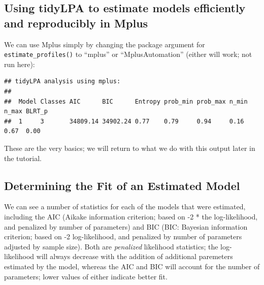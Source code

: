 \documentclass[man]{apa6}
\newenvironment{Shaded}{\begin{snugshade}}{\end{snugshade}}
\newcommand{\DataTypeTok}[1]{\textcolor[rgb]{0.13,0.29,0.53}{#1}}
\newcommand{\DecValTok}[1]{\textcolor[rgb]{0.00,0.00,0.81}{#1}}
\newcommand{\KeywordTok}[1]{\textcolor[rgb]{0.13,0.29,0.53}{\textbf{#1}}}
\newcommand{\NormalTok}[1]{#1}
\newcommand{\OperatorTok}[1]{\textcolor[rgb]{0.81,0.36,0.00}{\textbf{#1}}}
\newcommand{\StringTok}[1]{\textcolor[rgb]{0.31,0.60,0.02}{#1}}
\begin{document}
\hypertarget{using-tidylpa-to-estimate-models-efficiently-and-reproducibly-in-mplus}{%
\subsection{Using tidyLPA to estimate models efficiently and reproducibly in Mplus}\label{using-tidylpa-to-estimate-models-efficiently-and-reproducibly-in-mplus}}

We can use Mplus simply by changing the package argument for
\texttt{estimate\_profiles()} to \enquote{mplus} or \enquote{MplusAutomation} (either will work; not run
here):

\begin{Shaded}
\end{Shaded}

\begin{verbatim}
## tidyLPA analysis using mplus: 
## 
##  Model Classes AIC      BIC      Entropy prob_min prob_max n_min n_max BLRT_p
##  1     3       34809.14 34902.24 0.77    0.79     0.94     0.16  0.67  0.00
\end{verbatim}

These are the very basics; we will return to what we do with this output later
in the tutorial.

\hypertarget{determining-the-fit-of-an-estimated-model}{%
\subsection{Determining the Fit of an Estimated Model}\label{determining-the-fit-of-an-estimated-model}}

We can see a number of statistics for each of the models that were estimated,
including the AIC (Aikake information criterion; based on -2 * the
log-likelihood, and penalized by number of parameters) and BIC (BIC: Bayesian
information criterion; based on -2 log-likelihood, and penalized by number of
parameters adjusted by sample size). Both are \emph{penalized} likelihood statistics;
the log-likelihood will always decrease with the addition of additional
paremeters estimated by the model, whereas the AIC and BIC will account for the
number of parameters; lower values of either indicate better fit.
\end{document}
